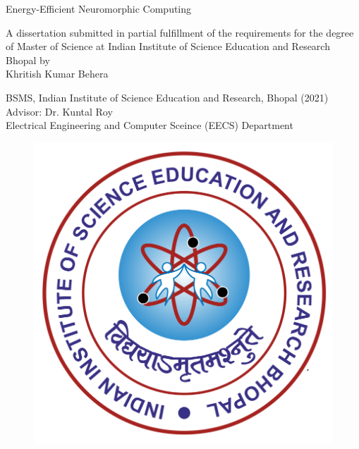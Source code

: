 \documentclass[a4paper, 12pt]{book}
\begin{document}
\thispagestyle{empty}

\thispagestyle{empty}
\cleardoublepage

\thispagestyle{empty}

\thispagestyle{empty}
\cleardoublepage



{}
{}
\begin{titlepage}
\noindent
\begin{center}
\vspace*{0.5mm}
{{\large{Energy-Efficient Neuromorphic Computing}}}

\vspace{1cm}

\large{A dissertation submitted in partial fulfillment of the requirements for the degree of Master of Science at Indian Institute of Science Education and Research Bhopal}
\vspace{2cm}
\large{by}\\
\large{Khritish Kumar Behera}\\
\begin{large}
{BSMS, Indian Institute of Science Education and Research, Bhopal (2021)}\\
\vspace{3cm}
Advisor: Dr. Kuntal Roy\\
Electrical Engineering and Computer Sceince (EECS) Department
\end{large}
\begin{figure}[H]
	\centering
   \includegraphics[scale=0.7]{Images/logo.png} 

\end{figure}
\end{center}
\end{titlepage}
\end{document}
